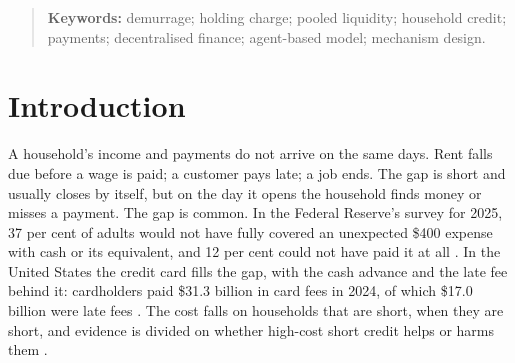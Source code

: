 \documentclass[10pt,a4paper]{article}
\theoremstyle{remark}
\let\savedsection\section
\renewcommand{\section}{\FloatBarrier\savedsection}
\begin{document}
\begin{abstract}
The demurrage is \ChargeFrom{} to \ChargeTo{} a year, \ChargeDollars{} a
household. It cuts the price of a bridge by \BridgeCutLow{} to
\BridgeCutHigh{}, to \BridgePriceCpm{} a year, keeps cash standing by against
the peak of demand, and leaves household wealth \GainPerChargeDollar{} dollars
higher for each dollar collected than the same pool without it. Unlike the
demurrage of Gesell, it works through the price and availability of credit
and not the speed of spending.

The registered claim, non-inferior real cost with more payments completed and
no household group behind, holds in \RegionCellsZero{} of \CellsNoDistress{}
cells with no distress when savers enter on the pool's published quote (the
quote rule), and in \ReadSecondRegion{} when they enter on its realised return
(the record rule): households still gain in every cell, but the pool does not
hold its capital. Under a wage loss of the size of 2009 the share of payments
that fail stays below that of banks and cards on average
(\FailCpmStressMean{} against \FailBanksStressMean{}), owners can run on the
pool at high launch participation, and the claim holds in \RegionCellsTwo{}
cells under the quote rule and \ReadSecondRegionTwo{} under the record rule.
These are the boundaries of the result.
\end{abstract}
\begin{quotation}\small\noindent
\textbf{Keywords:} demurrage; holding charge; pooled liquidity; household credit; payments; decentralised
finance; agent-based model; mechanism design.
\end{quotation}

\section{Introduction}
\label{sec:intro}
A household's income and payments do not arrive on the same days. Rent
falls due before a wage is paid; a customer pays late; a job ends. The gap is
short and usually closes by itself, but on the day it opens the household
finds money or misses a payment. The gap is common. In the Federal
Reserve's survey for 2025, 37 per cent of adults would not have fully covered an
unexpected \$400 expense with cash or its equivalent, and 12
per cent could not have paid it at all \cite{shed}. In the United States
the credit card fills the gap, with the cash advance
and the late fee behind it: cardholders paid \$31.3 billion in card fees in
2024, of which \$17.0 billion were late fees \cite{cfpb}. The cost falls on
households that are short, when they are short, and evidence is divided
on whether high-cost short credit helps or harms them
\cite{morse,melzer}.
\end{document}

